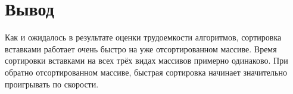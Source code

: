 \section{Вывод}

Как и ожидалось в результате оценки трудоемкости алгоритмов, сортировка вставками работает очень быстро на уже отсортированном массиве.
Время сортировки вставками на всех трёх видах массивов примерно одинаково.
При обратно отсортированном массиве, быстрая сортировка начинает значительно проигрывать по скорости.

